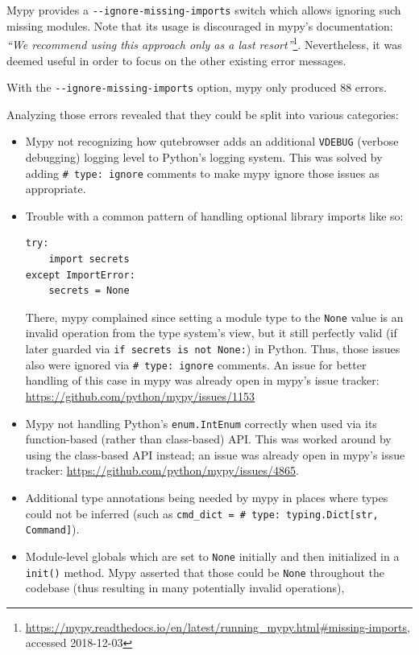 \documentclass[a4paper,parskip=full]{scrreprt}
\newcommand{\py}[1]{\texttt{#1}}
\begin{document}
Mypy provides a \verb|--ignore-missing-imports| switch which allows ignoring
such missing modules. Note that its usage is discouraged in mypy's documentation:
\emph{``We recommend using this approach only as a last resort''}\footnote{\url{https://mypy.readthedocs.io/en/latest/running_mypy.html\#missing-imports},
accessed 2018-12-03}. Nevertheless, it was deemed useful in order to focus on
the other existing error messages.

With the \verb|--ignore-missing-imports| option, mypy only produced 88 errors.

Analyzing those errors revealed that they could be split into various
categories:

\begin{itemize}
  \item Mypy not recognizing how qutebrowser adds an additional \verb|VDEBUG|
    (verbose debugging) logging level to Python's logging system. This was
    solved by adding \py{# type: ignore} comments to make mypy ignore those
    issues as appropriate.
  \item Trouble with a common pattern of handling optional library imports like so:
    \begin{verbatim}
try:
    import secrets
except ImportError:
    secrets = None
\end{verbatim}
    There, mypy complained since setting a module type to the
    \verb|None| value is an invalid operation from the type system's view, but
    it still perfectly valid (if later guarded via \py{if secrets is not None:})
    in Python. Thus, those issues also were ignored via \py{# type: ignore}
    comments. An issue for better handling of this case in mypy was already
    open in mypy's issue tracker: \url{https://github.com/python/mypy/issues/1153}
  \item Mypy not handling Python's \py{enum.IntEnum} correctly when used via
    its function-based (rather than class-based) API. This was worked around by
    using the class-based API instead; an issue was already open in mypy's issue
    tracker: \url{https://github.com/python/mypy/issues/4865}.
  \item Additional type annotations being needed by mypy in places where types
    could not be inferred (such as \texttt{cmd_dict = {} # type: typing.Dict[str, Command]}).
  \item Module-level globals which are set to \py{None} initially and then
    initialized in a \py{init()} method. Mypy asserted that those could be \py{None}
    throughout the codebase (thus resulting in many potentially invalid operations),

\end{itemize}
\end{document}
